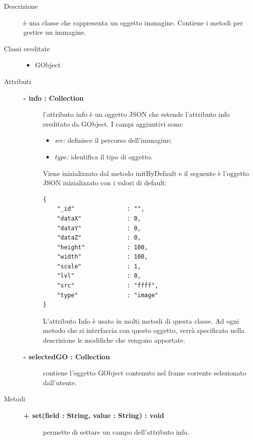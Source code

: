 \begin{description}
\item[Descrizione] \hfill
	è una classe che rappresenta un oggetto immagine. Contiene i metodi per gestire un immagine.
	
\item[Classi ereditate] \hfill
	\begin{itemize}
		\item GObject
	\end{itemize}
	
\item[Attributi] \hfill
	\begin{description}
		\item[\textbf{- info : Collection			}] \hfill
			l'attributo info è un oggetto JSON che estende l'attributo info ereditato da GObject. I campi aggiuntivi sono:
	\begin{itemize}
		\item \textit{src:} definisce il percorso dell'immagine;
		\item \textit{type:} identifica il tipo di oggetto.		
	\end{itemize}
	Viene inizializzato dal metodo initByDefault e il seguente è l'oggetto JSON inizializzato con i valori di default:
\begin{lstlisting}
{
    "_id"               : "",    
    "dataX"             : 0,
    "dataY"             : 0,
    "dataZ"             : 0,
    "height"            : 100,
    "width"             : 100,
    "scale"             : 1,
    "lvl"               : 0,
    "src"               : "ffff",
    "type"              : "image"
}
\end{lstlisting}					
                 L'attributo Info è usato in molti metodi di questa classe. Ad ogni metodo che si interfaccia con questo oggetto, verrà specificato nella descrizione le modifiche che vengono apportate. 
    \end{description}
	\begin{description}
		\item[\textbf{- selectedGO : Collection			}] \hfill
			contiene l'oggetto GObject contenuto nel frame corrente selezionato dall'utente.  
	\end{description}	
	
\item[Metodi] \hfill

		\begin{description}
		\item[\textbf{\color{blue}+ set(field : String, value : String) : void			}] \hfill
			permette di settare un campo dell'attributo info.
			

\end{description}
\end{description}

